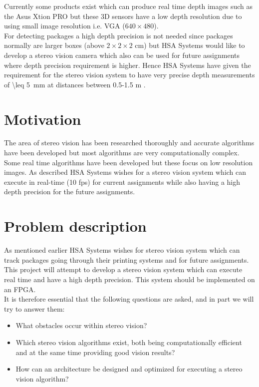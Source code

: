 Currently some products exist which can produce real time depth images such as the Asus Xtion PRO \cite{asusxtion} but these 3D sensors have a low depth resolution due to using small image resolution i.e. VGA ($640\times 480$).\\

For detecting packages a high depth precision is not needed since packages normally are larger boxes (above $2\times 2\times 2$ \si{\centi\meter}) but HSA Systems would like to develop a stereo vision camera which also can be used for future assignments where depth precision requirement is higher. Hence HSA Systems have given the requirement for the stereo vision system to have very precise depth measurements of \SI{\leq 5}{\milli\meter} at distances between 0.5-1.5 m \label{req:dispre}.

\section{Motivation}\label{sec:intromotiv}
The area of stereo vision has been researched thoroughly and accurate algorithms have been developed but most algorithms are very computationally complex. Some real time algorithms have been developed but these focus on low resolution images. As described HSA Systems wishes for a stereo vision system which can execute in real-time (10 fps) for current assignments \label{req:framerate} while also having a high depth precision for the future assignments. 

\section{Problem description}
As mentioned earlier HSA Systems wishes for stereo vision system which can track packages  going through their printing systems and for future assignments. This project will attempt to develop a stereo vision system which can execute real time and have a high depth precision. This system should be implemented on an FPGA.\\
It is therefore essential that the following questions are asked, and in part we will try to answer them:
\begin{itemize}
  \item What obstacles occur within stereo vision?
  \item Which stereo vision algorithms exist, both being computationally efficient and at the same time providing good vision results?
  \item How can an architecture be designed and optimized for executing a stereo vision algorithm?
\end{itemize}

